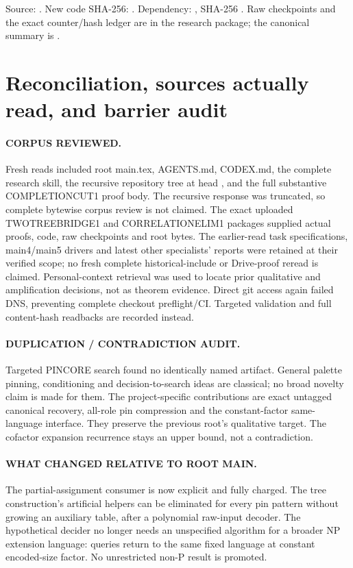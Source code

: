 \documentclass[11pt]{article}
\begin{document}
Source: . New code SHA-256:
.
Dependency: , SHA-256
.
Raw checkpoints and the exact counter/hash ledger are in the research package;
the canonical summary is .

\section{Reconciliation, sources actually read, and barrier audit}
\paragraph{CORPUS REVIEWED.}
Fresh reads included root main.tex, AGENTS.md, CODEX.md, the complete research
skill, the recursive repository tree at head
, and the full substantive
COMPLETIONCUT1 proof body. The recursive response was truncated, so complete
bytewise corpus review is not claimed. The exact uploaded TWOTREEBRIDGE1 and
CORRELATIONELIM1 packages supplied actual proofs, code, raw checkpoints and
root bytes. The earlier-read task specifications, main4/main5 drivers and
latest other specialists' reports were retained at their verified scope;
no fresh complete historical-include or Drive-proof reread is claimed.
Personal-context retrieval was used to locate prior qualitative and
amplification decisions, not as theorem evidence. Direct git access again
failed DNS, preventing complete checkout preflight/CI. Targeted validation
and full content-hash readbacks are recorded instead.

\paragraph{DUPLICATION / CONTRADICTION AUDIT.}
Targeted PINCORE search found no identically named artifact. General palette
pinning, conditioning and decision-to-search ideas are classical; no broad
novelty claim is made for them. The project-specific contributions are exact
untagged canonical recovery, all-role pin compression and the constant-factor
same-language interface. They preserve the previous root's qualitative target.
The cofactor expansion recurrence stays an upper bound, not a contradiction.

\paragraph{WHAT CHANGED RELATIVE TO ROOT MAIN.}
The partial-assignment consumer is now explicit and fully charged. The tree
construction's artificial helpers can be eliminated for every pin pattern
without growing an auxiliary table, after a polynomial raw-input decoder.
The hypothetical decider no longer needs an unspecified algorithm for a
broader NP extension language: queries return to the same fixed language at
constant encoded-size factor. No unrestricted non-P result is promoted.
\end{document}

